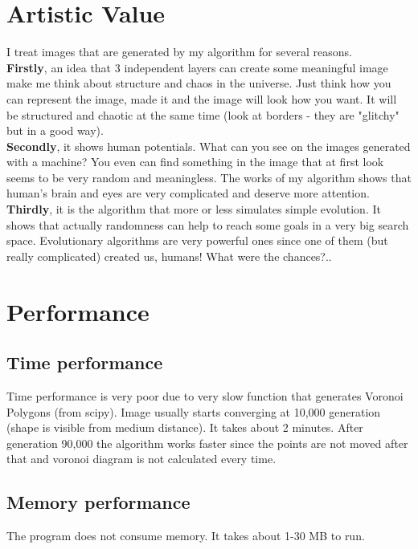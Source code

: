 \documentclass{article}
\begin{document}
\section{Artistic Value}
I treat images that are generated by my algorithm for several reasons.\\
\textbf{Firstly}, an idea that 3 independent layers can create some meaningful image make me think about structure and chaos in the universe. Just think how you can represent the image, made it and the image will look how you want. It will be structured and chaotic at the same time (look at borders - they are "glitchy" but in a good way). \\
\textbf{Secondly}, it shows human potentials. What can you see on the images generated with a machine? You even can find something in the image that at first look seems to be very random and meaningless. The works of my algorithm shows that human's brain and eyes are very complicated and deserve more attention. \\
\textbf{Thirdly}, it is the algorithm that more or less simulates simple evolution. It shows that actually randomness can help to reach some goals in a very big search space. Evolutionary algorithms are very powerful ones since one of them (but really complicated) created us, humans! What were the chances?..
\section{Performance}
\subsection{Time performance}
Time performance is very poor due to very slow function that generates Voronoi Polygons (from scipy). Image usually starts converging at 10,000 generation (shape is visible from medium distance). It takes about 2 minutes. After generation 90,000 the algorithm works faster since the points are not moved after that and voronoi diagram is not calculated every time.
\subsection{Memory performance}
The program does not consume memory. It takes about 1-30 MB to run.
\end{document}
